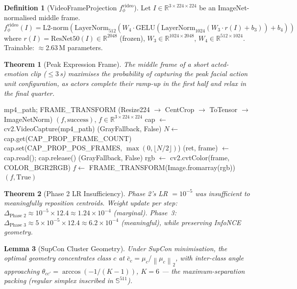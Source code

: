 \documentclass[12pt,a4paper]{article}
\theoremstyle{definition}
\newtheorem{definition}{Definition}[section]
\theoremstyle{plain}
\newtheorem{theorem}{Theorem}[section]
\newtheorem{lemma}[theorem]{Lemma}
\theoremstyle{remark}
\newcommand{\R}{\mathbb{R}}
\newcommand{\Sph}{\mathbb{S}}
\newcommand{\Norm}[1]{\left\|#1\right\|_2}
\newcommand{\LN}{\mathrm{LayerNorm}}
\newcommand{\GELU}{\mathrm{GELU}}
\begin{document}
\begin{definition}[VideoFrameProjection $f_\phi^{\text{video}}$]
Let $I \in \R^{3 \times 224 \times 224}$ be an ImageNet-normalised middle frame.
\[
  f_\phi^{\text{video}}(I) = \text{L2-norm}\!\left(\LN_{512}(W_4 \cdot \GELU(\LN_{1024}(W_3 \cdot r(I) + b_3)) + b_4)\right)
\]
where $r(I) = \text{ResNet50}(I) \in \R^{2048}$ (frozen), $W_3 \in \R^{1024 \times 2048}$, $W_4 \in \R^{512 \times 1024}$. Trainable: $\approx$2.63\,M parameters.
\end{definition}

\begin{theorem}[Peak Expression Frame]
The middle frame of a short acted-emotion clip ($\le 3$\,s) maximises the probability of capturing the peak facial action unit configuration, as actors complete their ramp-up in the first half and relax in the final quarter.
\end{theorem}

\begin{algorithm}[H]
\caption{CREMA-D Middle-Frame Extraction}
\label{alg:frame_extract}
\begin{algorithmic}[1]
\Require mp4\_path; FRAME\_TRANSFORM (Resize224 $\to$ CentCrop $\to$ ToTensor $\to$ ImageNetNorm)
\Ensure $(f, \text{success})$, $f \in \R^{3 \times 224 \times 224}$
\State cap $\gets$ cv2.VideoCapture(mp4\_path)
 \Return (GrayFallback, False) \EndIf
\State $N \gets$ cap.get(CAP\_PROP\_FRAME\_COUNT)
\State cap.set(CAP\_PROP\_POS\_FRAMES, $\max(0, \lfloor N/2 \rfloor)$) 
\State (ret, frame) $\gets$ cap.read(); cap.release()
 \Return (GrayFallback, False) \EndIf
\State rgb $\gets$ cv2.cvtColor(frame, COLOR\_BGR2RGB)
\State $f \gets$ FRAME\_TRANSFORM(Image.fromarray(rgb))
\State \Return $(f, \text{True})$
\end{algorithmic}
\end{algorithm}

\begin{theorem}[Phase 2 LR Insufficiency]
Phase 2's LR $= 10^{-5}$ was insufficient to meaningfully reposition centroids. Weight update per step: $\Delta_{\text{Phase 2}} \approx 10^{-5} \times 12.4 \approx 1.24 \times 10^{-4}$ (marginal). Phase~3: $\Delta_{\text{Phase 3}} \approx 5 \times 10^{-5} \times 12.4 \approx 6.2 \times 10^{-4}$ (meaningful), while preserving InfoNCE geometry.
\end{theorem}

\begin{lemma}[SupCon Cluster Geometry]
Under SupCon minimisation, the optimal geometry concentrates class $c$ at $\bar{c}_c = \mu_c/\Norm{\mu_c}$, with inter-class angle approaching $\theta_{cc'} = \arccos(-1/(K-1))$, $K=6$ --- the maximum-separation packing (regular simplex inscribed in $\Sph^{511}$).
\end{lemma}
\end{document}
